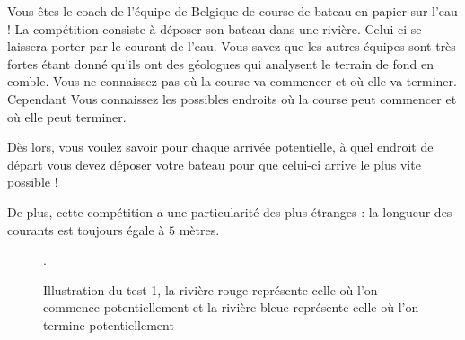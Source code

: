 \problemname{\problemyamlname}


\newcommand{\maxn}{}

Vous êtes le coach de l'équipe de Belgique de course de bateau en papier sur l'eau ! La compétition consiste à déposer son bateau dans une rivière. Celui-ci se laissera porter par le courant de l'eau.
Vous savez que les autres équipes sont très fortes étant donné qu'ils ont des géologues qui analysent le terrain de fond en comble. Vous ne connaissez pas où la course va commencer et où elle va terminer. Cependant Vous connaissez les possibles endroits où la course peut commencer et où elle peut terminer.

Dès lors, vous voulez savoir pour chaque arrivée potentielle, à quel endroit de départ vous devez déposer votre bateau pour que celui-ci arrive le plus vite possible !

De plus, cette compétition a une particularité des plus étranges : la longueur des courants est toujours égale à $5$ mètres.

\begin{figure}[h]
    \begin{center}
    \end{center}
    \caption{Illustration du test 1, la rivière rouge représente celle où l'on commence potentiellement et la rivière bleue représente celle où l'on termine potentiellement}.
\end{figure}

